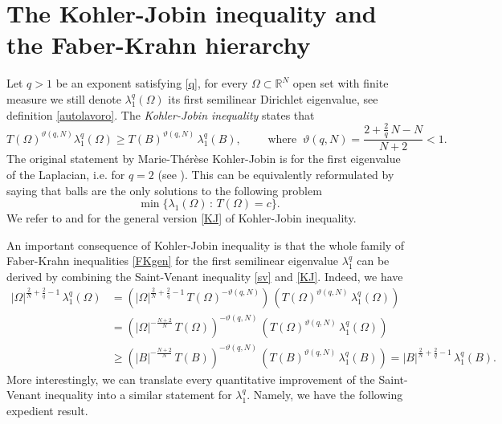 \documentclass{amsart}
\theoremstyle{definition}
\numberwithin{equation}{section}
\begin{document}
\appendix

\section{The Kohler-Jobin inequality and the Faber-Krahn hierarchy}
\label{sec:KJ}

Let $q>1$ be an exponent satisfying \eqref{q}, for every $\Omega\subset\mathbb{R}^N$ open set with finite measure we still denote $\lambda^q_1(\Omega)$ its first semilinear Dirichlet eigenvalue, see definition \eqref{autolavoro}. The {\it Kohler-Jobin inequality} states that 
\begin{equation}
\label{KJ}
T(\Omega)^{\vartheta(q,N)} \lambda_1^q(\Omega)\ge T(B)^{\vartheta(q,N)}\, \lambda_1^q(B),\qquad \mbox{ where }\ \vartheta(q,N)=\frac{2+\displaystyle\frac{2}{q}\,N-N}{N+2}<1.
\end{equation}
The original statement by Marie-Th\'er\`ese Kohler-Jobin is for the first eigenvalue of the Laplacian, i.e. for $q=2$ (see \cite[Th\'eor\`eme 1]{MR0511908}). This can be equivalently reformulated by saying that balls are the only solutions to the following problem
\[
\min\{\lambda_1(\Omega)\, :\, T(\Omega)=c\}.
\]
We refer to \cite[Theorem 3]{MR0641547} and \cite[Theorem 1.1]{MR3264206} for the general version \eqref{KJ} of Kohler-Jobin inequality.
\par
An important consequence of Kohler-Jobin inequality is that the whole family of Faber-Krahn inequalities \eqref{FKgen} for the first semilinear eigenvalue $\lambda^q_1$
can be derived by combining the Saint-Venant inequality \eqref{sv} and \eqref{KJ}. Indeed, we have
\[
\begin{split}
|\Omega|^{\frac{2}{N}+\frac{2}{q}-1}\, \lambda_1^q(\Omega)&=\left(|\Omega|^{\frac{2}{N}+\frac{2}{q}-1}\,T(\Omega)^{-\vartheta(q,N)}\right)\, \left(T(\Omega)^{\vartheta(q,N)}\,\lambda_1^q(\Omega)\right)\\
&=\left(|\Omega|^{-\frac{N+2}{N}}\,T(\Omega)\right)^{-\vartheta(q,N)}\, \left(T(\Omega)^{\vartheta(q,N)}\,\lambda^q_1(\Omega)\right)\\
&\ge \left(|B|^{-\frac{N+2}{N}}\,T(B)\right)^{-\vartheta(q,N)}\, \left(T(B)^{\vartheta(q,N)}\,\lambda_1^q(B)\right)=|B|^{\frac{2}{N}+\frac{2}{q}-1}\, \lambda_1^q(B).
\end{split}
\]
More interestingly, we can translate every quantitative improvement of the Saint-Venant inequality into a similar statement for $\lambda_1^q$. Namely, we have the following expedient result.
\end{document}
